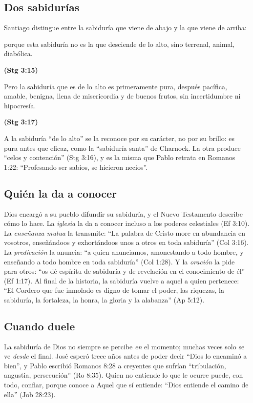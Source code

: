 \documentclass[11pt,letterpaper]{article}
\newcommand{\fuente}[1]{\par\hfill{\upshape\bfseries\small\textcolor{azul}{#1}}}
\begin{document}
\subsection{Dos sabidurías}

Santiago distingue entre la sabiduría que viene de abajo y la que viene de arriba:

\begin{cita}porque esta sabiduría no es la que desciende de lo alto, sino terrenal, animal, diabólica.\fuente{(Stg 3:15)}\end{cita}

\begin{cita}Pero la sabiduría que es de lo alto es primeramente pura, después pacífica, amable, benigna, llena de misericordia y de buenos frutos, sin incertidumbre ni hipocresía.\fuente{(Stg 3:17)}\end{cita}

A la sabiduría ``de lo alto'' se la reconoce por su carácter, no por su brillo: es pura antes que eficaz, como la ``sabiduría santa'' de Charnock. La otra produce ``celos y contención'' (Stg 3:16), y es la misma que Pablo retrata en Romanos 1:22: ``Profesando ser sabios, se hicieron necios''.

\subsection{Quién la da a conocer}

Dios encargó a su pueblo difundir su sabiduría, y el Nuevo Testamento describe cómo lo hace. La \emph{iglesia} la da a conocer incluso a los poderes celestiales (Ef 3:10). La \emph{enseñanza mutua} la transmite: ``La palabra de Cristo more en abundancia en vosotros, enseñándoos y exhortándoos unos a otros en toda sabiduría'' (Col 3:16). La \emph{predicación} la anuncia: ``a quien anunciamos, amonestando a todo hombre, y enseñando a todo hombre en toda sabiduría'' (Col 1:28). Y la \emph{oración} la pide para otros: ``os dé espíritu de sabiduría y de revelación en el conocimiento de él'' (Ef 1:17). Al final de la historia, la sabiduría vuelve a aquel a quien pertenece: ``El Cordero que fue inmolado es digno de tomar el poder, las riquezas, la sabiduría, la fortaleza, la honra, la gloria y la alabanza'' (Ap 5:12).

\subsection{Cuando duele}

La sabiduría de Dios no siempre se percibe \emph{en} el momento; muchas veces solo se ve \emph{desde} el final. José esperó trece años antes de poder decir ``Dios lo encaminó a bien'', y Pablo escribió Romanos 8:28 a creyentes que sufrían ``tribulación, angustia, persecución'' (Ro 8:35). Quien no entiende lo que le ocurre puede, con todo, confiar, porque conoce a Aquel que sí entiende: ``Dios entiende el camino de ella'' (Job 28:23).
\end{document}
